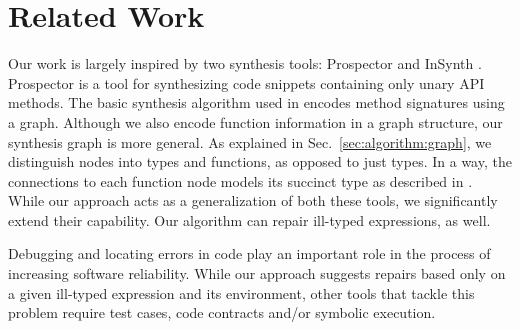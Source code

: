 \section{Related Work}
\label{sec:related}

Our work is largely inspired by two synthesis tools: Prospector \cite{MandelinetALL2005Jungloid} and InSynth \cite{GveroETAL13CompleteCompletionTypesWeights, DBLP:conf/cav/GveroKP11}. Prospector is a tool for synthesizing code snippets containing only unary API methods. The basic synthesis algorithm used in \cite{MandelinetALL2005Jungloid} encodes method signatures using a graph. Although we also encode function information in a graph structure, our synthesis graph is more general. As explained in Sec.~\ref{sec:algorithm:graph}, we distinguish nodes into types and functions, as opposed to just types. In a way, the connections to each function node models its succinct type as described in \cite{GveroETAL13CompleteCompletionTypesWeights}. While our approach acts as a generalization of both these tools, we significantly extend their capability. Our algorithm can repair ill-typed expressions, as well.

Debugging and locating errors in code \cite{Pavlinovic:2014, Chandra:2011:AD} play an important role in the process of increasing software reliability. While our approach suggests repairs based only on a given ill-typed expression and its environment, other tools that tackle this problem \cite{MintHint, DBLP:journals/tse/GouesNFW12, DBLP:conf/icse/NguyenQRC13, DBLP:conf/kbse/PeiWFNM11} require test cases, code contracts and/or symbolic execution.
